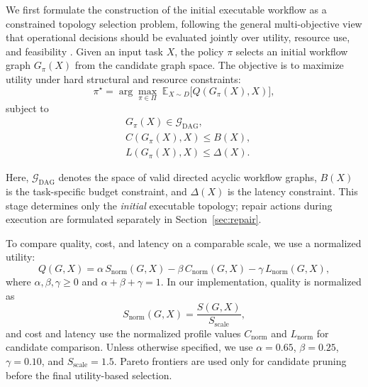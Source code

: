 \documentclass[acmsmall,review,anonymous]{acmart}
\begin{document}
We first formulate the construction of the initial executable workflow as a constrained topology selection problem, following the general multi-objective view that operational decisions should be evaluated jointly over utility, resource use, and feasibility \cite{gonzalez2022constrained,miettinen2010nonlinear,sun2023pareto,tian2024constraint}.
Given an input task $X$, the policy $\pi$ selects an initial workflow graph $G_{\pi}(X)$ from the candidate graph space.
The objective is to maximize utility under hard structural and resource constraints:
\begin{equation}
\pi^\star
=
\arg\max_{\pi\in\Pi}
\;\mathbb{E}_{X\sim D}\big[Q(G_{\pi}(X),X)\big],
\label{eq:init_obj}
\end{equation}
subject to
\begin{equation}
\begin{aligned}
&G_{\pi}(X)\in\mathcal{G}_{\mathrm{DAG}},\\
&C(G_{\pi}(X),X)\le B(X),\\
&L(G_{\pi}(X),X)\le \Delta(X).
\end{aligned}
\label{eq:init_constraints}
\end{equation}

Here, $\mathcal{G}_{\mathrm{DAG}}$ denotes the space of valid directed acyclic workflow graphs,
$B(X)$ is the task-specific budget constraint, and $\Delta(X)$ is the latency constraint.
This stage determines only the \emph{initial} executable topology; repair actions during execution are formulated separately in Section~\ref{sec:repair}.

To compare quality, cost, and latency on a comparable scale, we use a normalized utility:
\begin{equation}
Q(G,X)=\alpha\,S_{\mathrm{norm}}(G,X)-\beta\,C_{\mathrm{norm}}(G,X)-\gamma\,L_{\mathrm{norm}}(G,X),
\label{eq:utility}
\end{equation}
where $\alpha,\beta,\gamma\ge 0$ and $\alpha+\beta+\gamma=1$.
In our implementation, quality is normalized as
\begin{equation}
S_{\mathrm{norm}}(G,X)=\frac{S(G,X)}{S_{\mathrm{scale}}},
\label{eq:s_norm}
\end{equation}
and cost and latency use the normalized profile values $C_{\mathrm{norm}}$ and $L_{\mathrm{norm}}$ for candidate comparison.
Unless otherwise specified, we use $\alpha=0.65$, $\beta=0.25$, $\gamma=0.10$, and $S_{\mathrm{scale}}=1.5$.
Pareto frontiers are used only for candidate pruning before the final utility-based selection.
\end{document}
